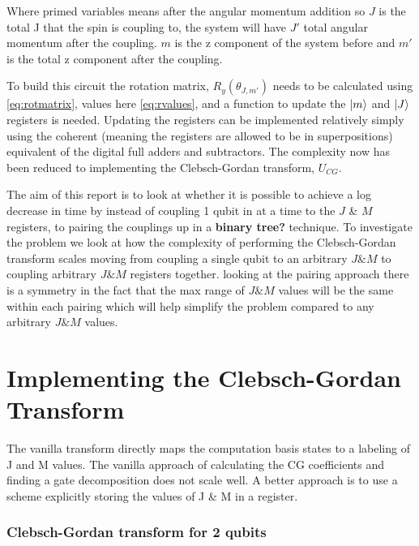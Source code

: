 \documentclass[12pt]{article}
\begin{document}
Where primed variables means after the angular momentum addition so $J$ is the total J that the spin is coupling to, the system will have $J'$ total angular momentum after the coupling. $m$ is the z component of the system before and $m'$ is the total z component after the coupling.

To build this circuit the rotation matrix, $R_y(\theta_{J,m'})$ needs to be calculated using \autoref{eq:rotmatrix}, values here \autoref{eq:rvalues}, and a function to update the $\left\vert{m}\right\rangle$ and $\left\vert{J}\right\rangle$ registers is needed. Updating the registers can be implemented relatively simply using the coherent (meaning the registers are allowed to be in superpositions) equivalent of the digital full adders and subtractors. The complexity now has been reduced to implementing the Clebsch-Gordan transform, $U_{CG}$.

The aim of this report is to look at whether it is possible to achieve a log decrease in time by instead of coupling 1 qubit in at a time to the $J$ \& $M$ registers, to pairing the couplings up in a \textbf{binary tree?} technique. To investigate the problem we look at how the complexity of performing the Clebsch-Gordan transform scales moving from coupling a single qubit to an arbitrary $J \& M$ to coupling arbitrary $J \& M$ registers together. looking at the pairing approach there is a symmetry in the fact that the max range of $J \& M$ values will be the same within each pairing which will help simplify the problem
compared to any arbitrary $J \& M$ values.


\section{Implementing the Clebsch-Gordan Transform}

The vanilla transform directly maps the computation basis states to a labeling of J and M values. The vanilla approach of calculating the CG coefficients and finding a gate decomposition does not scale well. A better approach is to use a scheme explicitly storing the values of J \& M in a register.

\subsubsection{Clebsch-Gordan transform for 2 qubits}
\end{document}
